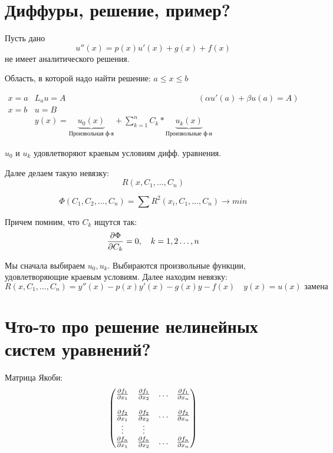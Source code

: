

\title{}
\author{Козырнов Александр Дмитриевич, ИУ7-32Б}
\date{\today}



\section{Диффуры, решение, пример?}

Пусть дано
\[
u''(x) = p(x)u'(x) + g(x) + f(x)
\] 
не имеет аналитического решения.

Область, в которой надо найти решение: $a \le x \le b$

\medskip

$$
\begin{matrix}
    x = a & L_au = A & (\alpha u'(a) + \beta u(a) = A)\\
    x = b & u = B\\
          &y(x) = \underbrace{u_0(x)}_{\text{Произвольная ф-я}}
          + \sum\limits_{k=1}^{n}C_k * \underbrace{u_k(x)}_{\text{Произвольные ф-и}}
\end{matrix}
$$

$u_0$ и $u_k$ удовлетворяют краевым условиям дифф. уравнения.

Далее делаем такую невязку:
\[
R(x,C_1,\ldots, C_n)
\] 

\[
\Phi(C_1,C_2,\ldots,C_n) = \sum\limits R^{2}(x_{i}, C_1,\ldots,C_n) \to min
\] 


Причем помним, что $C_k$ ищутся так:
\[
    \frac{\partial\Phi}{\partial C_k} = 0, \quad k = 1,2\ldots, n
\] 


Мы сначала выбираем $u_0, u_k$. Выбираются произвольные функции, удовлетворяющие
краевым условиям. Далее находим невязку:
\[
    R(x,C_1,\ldots,C_n) = y''(x) - p(x)y'(x) - g(x)y - f(x) \quad y(x) = u(x) \text{ замена}
\]

\section{Что-то про решение нелинейных систем уравнений?}

Матрица Якоби:
$$
\begin{pmatrix}
    \frac{\partial f_1}{\partial x_1} & \frac{\partial f_1}{\partial x_2} & \ldots & \frac{\partial f_1}{\partial x_{n}}\\
    \\
    \frac{\partial f_2}{\partial x_1} & \frac{\partial f_2}{\partial x_2} & \ldots & \frac{\partial f_2}{\partial x_{n}}\\
    \vdots & \vdots\\
    \frac{\partial f_n}{\partial x_1} & \frac{\partial f_n}{\partial x_2} & \ldots & \frac{\partial f_n}{\partial x_{n}}\\
\end{pmatrix} 
$$

